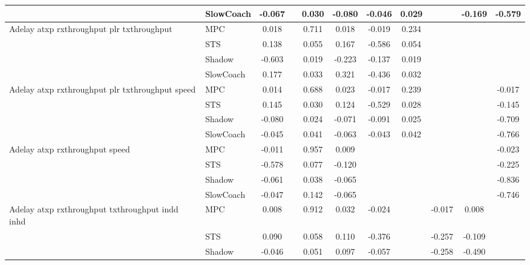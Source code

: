 \begin{tabular}{|l|l|*{9}{c|}}
                              & SlowCoach &   -0.067 &        &     0.030 & -0.080 & -0.046 &  0.029 &      &  -0.169 &   -0.579 \\
\midrule
Adelay atxp rxthroughput plr txthroughput    & MPC &    0.018 &        &     0.711 &  0.018 & -0.019 &  0.234 &      &      &       \\
                              & STS &    0.138 &        &     0.055 &  0.167 & -0.586 &  0.054 &      &      &       \\
                              & Shadow &   -0.603 &        &     0.019 & -0.223 & -0.137 &  0.019 &      &      &       \\
                              & SlowCoach &    0.177 &        &     0.033 &  0.321 & -0.436 &  0.032 &      &      &       \\
\midrule
Adelay atxp rxthroughput plr txthroughput speed    & MPC &    0.014 &        &     0.688 &  0.023 & -0.017 &  0.239 &      &      &   -0.017 \\
                              & STS &    0.145 &        &     0.030 &  0.124 & -0.529 &  0.028 &      &      &   -0.145 \\
                              & Shadow &   -0.080 &        &     0.024 & -0.071 & -0.091 &  0.025 &      &      &   -0.709 \\
                              & SlowCoach &   -0.045 &        &     0.041 & -0.063 & -0.043 &  0.042 &      &      &   -0.766 \\
\midrule
Adelay atxp rxthroughput speed    & MPC &   -0.011 &        &     0.957 &  0.009 &     &     &      &      &   -0.023 \\
                              & STS &   -0.578 &        &     0.077 & -0.120 &     &     &      &      &   -0.225 \\
                              & Shadow &   -0.061 &        &     0.038 & -0.065 &     &     &      &      &   -0.836 \\
                              & SlowCoach &   -0.047 &        &     0.142 & -0.065 &     &     &      &      &   -0.746 \\
\midrule
Adelay atxp rxthroughput txthroughput indd inhd    & MPC &    0.008 &        &     0.912 &  0.032 & -0.024 &     &  -0.017 &   0.008 &       \\
                              & STS &    0.090 &        &     0.058 &  0.110 & -0.376 &     &  -0.257 &  -0.109 &       \\
                              & Shadow &   -0.046 &        &     0.051 &  0.097 & -0.057 &     &  -0.258 &  -0.490 &       \\

\end{tabular}

